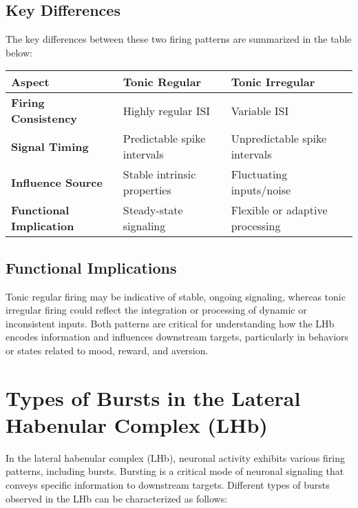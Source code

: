 \documentclass[a4paper,9pt]{extarticle}
\begin{document}
\subsection{Key Differences}
The key differences between these two firing patterns are summarized in the table below:

\begin{table}[h!]
\centering
\begin{tabular}{|l|l|l|}
\hline
\textbf{Aspect}              & \textbf{Tonic Regular}       & \textbf{Tonic Irregular}      \\ \hline
\textbf{Firing Consistency}  & Highly regular ISI           & Variable ISI                  \\ \hline
\textbf{Signal Timing}       & Predictable spike intervals  & Unpredictable spike intervals \\ \hline
\textbf{Influence Source}    & Stable intrinsic properties  & Fluctuating inputs/noise      \\ \hline
\textbf{Functional Implication} & Steady-state signaling       & Flexible or adaptive processing \\ \hline
\end{tabular}
\end{table}

\subsection{Functional Implications}
Tonic regular firing may be indicative of stable, ongoing signaling, whereas tonic irregular firing could reflect the integration or processing of dynamic or inconsistent inputs. Both patterns are critical for understanding how the LHb encodes information and influences downstream targets, particularly in behaviors or states related to mood, reward, and aversion.



\section{Types of Bursts in the Lateral Habenular Complex (LHb)}

In the lateral habenular complex (LHb), neuronal activity exhibits various firing patterns, including bursts. Bursting is a critical mode of neuronal signaling that conveys specific information to downstream targets. Different types of bursts observed in the LHb can be characterized as follows:
\end{document}
